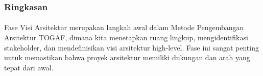 \documentclass[aspectratio=169, table]{beamer}
\begin{document}
	\begin{frame}
		\frametitle{Ringkasan}
		\framesubtitle{\hspace{1cm}}
		Fase Visi Arsitektur merupakan langkah awal dalam Metode Pengembangan Arsitektur TOGAF, dimana kita menetapkan ruang lingkup, mengidentifikasi stakeholder, dan mendefinisikan visi arsitektur high-level. Fase ini sangat penting untuk memastikan bahwa proyek arsitektur memiliki dukungan dan arah yang tepat dari awal.
	\end{frame}
\end{document}
